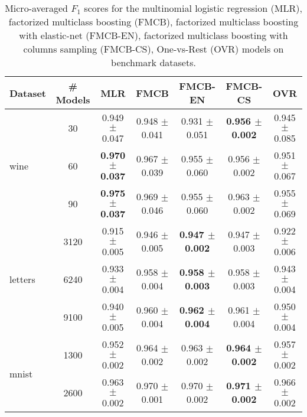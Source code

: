 \documentclass{standalone}
\begin{document}



\begin{table*}%
\label{exp-results}
\centering
\caption{Micro-averaged $F_{1}$ scores for the multinomial logistic regression (MLR), factorized multiclass boosting (FMCB), factorized multiclass boosting with elastic-net (FMCB-EN), factorized multiclass boosting with columns sampling (FMCB-CS), One-vs-Rest (OVR) models on benchmark datasets.}
\vskip 0.15in
\begin{small}
\begin{sc}
{\renewcommand{\arraystretch}{1.2}%
\begin{tabular}{|l|c|c|c|c|c|c|}
\hline
\abovespace\belowspace
Dataset		& \# Models 	& MLR & FMCB & FMCB-EN 	& FMCB-CS & OVR  \\
\hline\hline
\multirow{3}{*}{wine}
	& 30    		& 0.949 $\pm$ 0.047 		 & 0.948 $\pm$ 0.041 & 0.931 $\pm$ 0.051 & \textbf{0.956 $\pm$ 0.002} & 0.945 $\pm$ 0.085\\
	& 60	  		& \textbf{0.970 $\pm$ 0.037} & 0.967 $\pm$ 0.039 & 0.955 $\pm$ 0.060 & 0.956 $\pm$ 0.002 & 0.951 $\pm$ 0.067\\
	& 90    		& \textbf{0.975 $\pm$ 0.037} & 0.969 $\pm$ 0.046 & 0.955 $\pm$ 0.060 & 0.963 $\pm$ 0.002 & 0.955 $\pm$ 0.069\\
\hline
\multirow{3}{*}{letters}
	& 3120			& 0.915 $\pm$ 0.005 & 0.946 $\pm$ 0.005 & \textbf{0.947 $\pm$ 0.002} & 0.947 $\pm$ 0.003 & 0.922 $\pm$ 0.006\\
	& 6240	 		& 0.933 $\pm$ 0.004 & 0.958 $\pm$ 0.004 & \textbf{0.958 $\pm$ 0.003} & 0.958 $\pm$ 0.003 & 0.943 $\pm$ 0.004\\
	& 9100 			& 0.940 $\pm$ 0.005 & 0.960 $\pm$ 0.004 & \textbf{0.962 $\pm$ 0.004} & 0.961 $\pm$ 0.004 & 0.950 $\pm$ 0.004\\
\hline
\multirow{3}{*}{mnist}
	& 1300			& 0.952 $\pm$ 0.002 & 0.964 $\pm$ 0.002 			& 0.963 $\pm$ 0.002 			& \textbf{0.964 $\pm$ 0.002} & 0.957 $\pm$ 0.002\\
	& 2600			& 0.963 $\pm$ 0.002 & 0.970 $\pm$ 0.001 	& 0.970 $\pm$ 0.002 			& \textbf{0.971 $\pm$ 0.002} & 0.966 $\pm$ 0.002\\

\end{tabular}}
\end{sc}
\end{small}
\end{table*}
\end{document}
